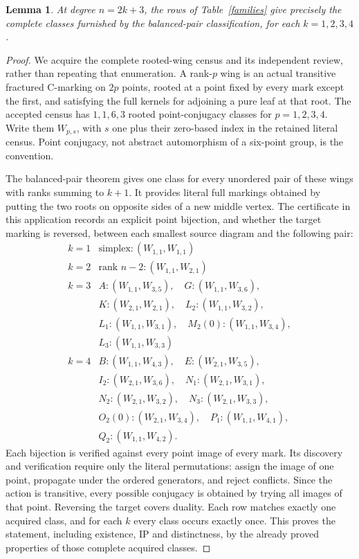 \documentclass[11pt,a4paper]{article}
\newtheorem{lemma}[theorem]{Lemma}
\begin{document}
\begin{lemma}\label{bases}
At degree $n=2k+3$, the rows of Table~\ref{families} give precisely
the complete classes furnished by the balanced-pair classification,
for each $k=1,2,3,4$.
\end{lemma}
\begin{proof}
We acquire the complete rooted-wing census and its independent
review, rather than repeating that enumeration. A rank-$p$ wing is
an actual transitive fractured C-marking on $2p$ points, rooted
at a point fixed by every mark except the first, and satisfying
the full kernels for adjoining a pure leaf at that root. The
accepted census has $1,1,6,3$ rooted point-conjugacy classes for
$p=1,2,3,4$. Write them $W_{p,s}$, with $s$ one plus their
zero-based index in the retained literal census. Point conjugacy,
not abstract automorphism of a six-point group, is the convention.

The balanced-pair theorem gives one class for every unordered
pair of these wings with ranks summing to $k+1$. It provides literal
full markings obtained by putting the two roots on opposite sides
of a new middle vertex. The certificate in this application records
an explicit point bijection, and whether the target marking is
reversed, between each smallest source diagram and the following
pair:
\[
\begin{array}{c|l}
k=1 & \text{simplex}: (W_{1,1},W_{1,1})\\
k=2 & \text{rank }n-2: (W_{1,1},W_{2,1})\\\hline
k=3 & A:(W_{1,1},W_{3,5}),\quad G:(W_{1,1},W_{3,6}),\\
&K:(W_{2,1},W_{2,1}),\quad L_2:(W_{1,1},W_{3,2}),\\
&L_1:(W_{1,1},W_{3,1}),\quad M_2(0):(W_{1,1},W_{3,4}),\\
&L_3:(W_{1,1},W_{3,3})\\\hline
k=4 & B:(W_{1,1},W_{4,3}),\quad E:(W_{2,1},W_{3,5}),\\
&I_2:(W_{2,1},W_{3,6}),\quad N_1:(W_{2,1},W_{3,1}),\\
&N_2:(W_{2,1},W_{3,2}),\quad N_3:(W_{2,1},W_{3,3}),\\
&O_2(0):(W_{2,1},W_{3,4}),\quad P_1:(W_{1,1},W_{4,1}),\\
&Q_2:(W_{1,1},W_{4,2}).
\end{array}
\]
Each bijection is verified against every point image of every mark.
Its discovery and verification require only the literal permutations:
assign the image of one point, propagate under the ordered generators,
and reject conflicts. Since the action is transitive, every possible
conjugacy is obtained by trying all images of that point. Reversing
the target covers duality. Each row matches exactly one acquired
class, and for each $k$ every class occurs exactly once. This proves
the statement, including existence, IP and distinctness, by the
already proved properties of those complete acquired classes.
\end{proof}
\end{document}
